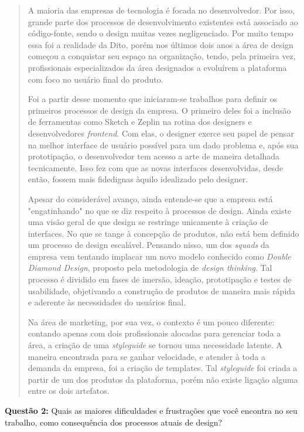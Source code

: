 \begin{quote}
    A maioria das empresas de tecnologia é focada no desenvolvedor. Por isso, grande parte dos processos de desenvolvimento existentes está associado ao código-fonte, sendo o design muitas vezes negligenciado. Por muito tempo essa foi a realidade da Dito, porém nos últimos dois anos a área de design começou a conquistar seu espaço na organização, tendo, pela primeira vez, profissionais especializados da área designados a evoluírem a plataforma com foco no usuário final do produto.
    
    Foi a partir desse momento que iniciaram-se trabalhos para definir os primeiros processos de design da empresa. O primeiro deles foi a inclusão de ferramentas como Sketch e Zeplin na rotina dos designers e desenvolvedores \textit{frontend}. Com elas, o designer exerce seu papel de pensar na melhor interface de usuário possível para um dado problema e, após sua prototipação, o desenvolvedor tem acesso a arte de maneira detalhada tecnicamente. Isso fez com que as novas interfaces desenvolvidas, desde então, fossem mais fidedignas àquilo idealizado pelo designer.
    
    Apesar do considerável avanço, ainda entende-se que a empresa está "engatinhando" no que se diz respeito à processos de design. Ainda existe uma visão geral de que design se restringe unicamente à criação de interfaces. No que se tange à concepção de produtos, não está bem definido um processo de design escalável. Pensando nisso, um dos \textit{squads} da empresa vem tentando implacar um novo modelo conhecido como \textit{Double Diamond Design}, proposto pela metodologia de \textit{design thinking}. Tal processo é dividido em fases de imersão, ideação, prototipação e testes de usabilidade, objetivando a construção de produtos de maneira mais rápida e aderente às necessidades do usuários final.
    
    Na área de marketing, por sua vez, o contexto é um pouco diferente: contando apenas com dois profissionais alocadas para gerenciar toda a área, a criação de uma \textit{styleguide} se tornou uma necessidade latente. A maneira encontrada para se ganhar velocidade, e atender à toda a demanda da empresa, foi a criação de templates. Tal \textit{styleguide} foi criada a partir de um dos produtos da plataforma, porém não existe ligação alguma entre os dois artefatos.
\end{quote}

\textbf{Questão 2:} Quais as maiores dificuldades e frustrações que você encontra no seu trabalho, como consequência dos processos atuais de design?

